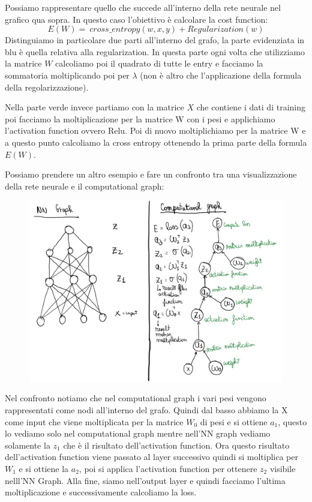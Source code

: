 \documentclass[14pt]{extreport}
\begin{document}
Possiamo rappresentare quello che succede all'interno della rete neurale nel grafico qua sopra. In questo caso l'obiettivo è calcolare la cost
function: $$E(W) = \ cross\_entropy(w,x,y) + Regularization(w)$$ Distinguiamo in particolare due parti all'interno del grafo, la parte evidenziata in
blu è quella relativa alla regularization. In questa parte ogni volta che utilizziamo la matrice $W$ calcoliamo poi il quadrato di tutte le entry e
facciamo la sommatoria moltiplicando poi per $\lambda$ (non è altro che l'applicazione della formula della regolarizzazione).

Nella parte verde invece partiamo con la matrice $X$ che contiene i dati di training poi facciamo la moltiplicazione per la matrice W con i pesi e
applichiamo l'activation function ovvero Relu. Poi di nuovo moltiplichiamo per la matrice W e a questo punto calcoliamo la cross entropy ottenendo la
prima parte della formula $E(W)$.


Possiamo prendere un altro esempio e fare un confronto tra una visualizzazione della rete neurale e il computational graph:

\begin{figure}[H]
	\centering
	\includegraphics[width=\linewidth]{397.jpeg}
\end{figure}

Nel confronto notiamo che nel computational graph i vari pesi vengono rappresentati come nodi all'interno del grafo. Quindi dal basso abbiamo la X
come input che viene moltiplicata per la matrice $W_0$ di pesi e si ottiene $a_1$, questo lo vediamo solo nel computational graph mentre nell'NN graph
vediamo solamente la $z_1$ che è il risultato dell'activation function. Ora questo risultato dell'activation function viene passato al layer
successivo quindi si moltiplica per $W_1$ e si ottiene la $a_2$, poi si applica l'activation function per ottenere $z_2$ visibile nelll'NN Graph. Alla
fine, siamo nell'output layer e quindi facciamo l'ultima moltiplicazione e successivamente calcoliamo la loss.
\end{document}
